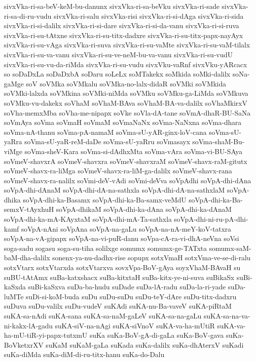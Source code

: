 {sivxVka-ri-sa-beV-keM-bu-danunx
sivxVka-ri-sa-beVku
sivxVka-ri-sade
sivxVka-ri-sa-di-ru-vudu
sivxVka-ri-salu
sivxVka-risi
sivxVka-ri-si-dAga
sivxVka-ri-sida
sivxVka-ri-si-dalilx
sivxVka-ri-si-dare
sivxVka-ri-si-da-vanu
sivxVka-ri-si-ruva
sivxVka-ri-su-tAtxne
sivxVka-ri-su-titx-dadxre
sivxVka-ri-su-titx-papx-nayAyx
sivxVka-ri-su-vAga
sivxVka-ri-suva
sivxVka-ri-su-vaMte
sivxVka-ri-su-vaM-tilalx
sivxVka-ri-su-va-vanu
sivxVka-ri-su-ve-neM-bu-va-vanu
sivxVka-ri-su-vudU
sivxVka-ri-su-vu-da-riMda
sivxVka-ri-su-vudu
sivxVku-vaRnf
sivxVku-yARcacx
so
soDaDxLa
soDaDxbA
soDaru
soLeLx
soMTakekx
soMkida
soMki-dalilx
soNa-gaMge
soV
soVMka
soVMkalu
soVMka-no-lalx-didaR
soVMki
soVMkida
soVMki-lalxda
soVMkina
soVMki-niMda
soVMku
soVMku-ga-LiMda
soVMkuva
soVMku-vu-dakekx
soVhaM
soVhaM-BAva
soVhaM-BA-va-dalilx
soVhaMkirxV
soVha-memxMba
soVha-me-nipapx
soVke
soVla-dA-tane
soVmA-dhaR-BU-SaNa
soVmAya
soVma
soVmaH
soVmaM
soVmaNaNx
soVma-NaNxna
soVma-dhara
soVma-nA-thanu
soVma-pA-namaM
soVma-sU-yAR-ginx-loV-cana
soVma-sU-yaRra
soVma-sU-yaR-reM-daDe
soVma-sU-yaRru
soVmasayx
soVma-shaM-Bu-viMge
soVma-sheV-Kara
soVma-si-dAdhxMta
soVma-vAra
soVma-vi-BU-SAya
soVmeV-shavxrA
soVmeV-shavxra
soVmeV-shavxraM
soVmeV-shavx-raM-gitutx
soVmeV-shavx-ra-liMga
soVmeV-shavx-ra-liM-ga-dalilx
soVmeV-shavx-rana
soVmeV-shavx-ra-nalilx
soVmi-deV-vAdi
soVmi-deVva
soVpAdhi
soVpA-dhi-dAna
soVpA-dhi-dAnaM
soVpA-dhi-dA-na-sathxla
soVpA-dhi-dA-na-sathxlaM
soVpA-dhika
soVpA-dhi-ka-Basamx
soVpA-dhi-ka-Ba-samx-veMdU
soVpA-dhi-ka-Ba-semxV-tAyxhuH
soVpA-dhikaM
soVpA-dhi-ka-dAna
soVpA-dhi-ka-dAnaM
soVpA-dhi-ka-mA-KAyxtaM
soVpA-dhi-mA-Ta-sathxla
soVpA-dhi-ni-ru-pA-dhi-kamf
soVpA-nAni
soVpAna
soVpA-na-gaLu
soVpA-na-nA-meY-koV-tatxra
soVpA-na-vA-gipapx
soVpA-na-vi-puR-danu
soVpa-cA-ra-vi-dhA-neVna
soVsi
soga-sadu
sogasu
soga-su-tiha
solilxge
somumx
somumx-ge-TATxta
somumx-saM-baM-dha-dalilx
sonenx-ya-nu-dadhx-rise
sopupx
sotxVmaH
sotxVma-ve-se-di-ralu
sotxVtarx
sotxVtarxda
sotxVtarxva
sovxVpa-BoV-gAya
soyxVhaM-BAvaH
su
suBU-tAtAmx
suBa-katxshacx
suBa-kitxtaH
suBa-kitx-ye-ni-suva
suBikaSx
suBi-kaSxda
suBi-kaSxva
suDa-ba-hudu
suDade
suDa-lA-radu
suDa-la-ri-yade
suDa-luMTe
suDi-si-koM-buda
suDu
suDu-suDu
suDu-teY-dAre
suDu-titx-dadxru
suDuva
suDu-valilx
suDu-vudeV
suKAdi
suKA-nu-Ba-vaveV
suKA-piRtaM
suKA-sa-nAdi
suKA-sana
suKA-sa-naM-gaLeV
suKA-sa-na-gaLu
suKA-sa-na-va-ni-kakx-lA-gadu
suKA-siV-na-nAgi
suKA-siVnoV
suKA-va-ha-mUtiR
suKA-va-ha-mU-tiR-yi-papx-tutxmU
suKa
suKa-BoV-gA-di-gaLa
suKa-BoV-gava
suKa-BoVketxrXV
suKaM
suKaM-gaLa
suKada
suKa-dalilx
suKa-dhAterxV
suKadi
suKa-diMda
suKa-diM-di-ru-titx-hanu
suKa-do-Dalu
}
